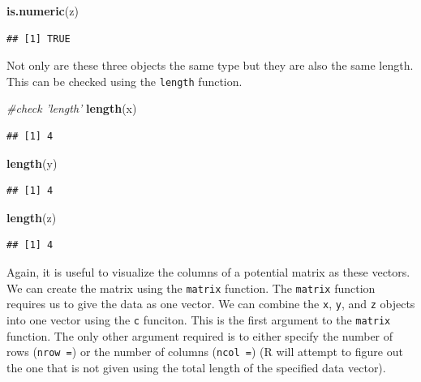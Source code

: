 \documentclass[
]{book}
\newenvironment{Shaded}{\begin{snugshade}}{\end{snugshade}}
\newcommand{\CommentTok}[1]{\textcolor[rgb]{0.56,0.35,0.01}{\textit{#1}}}
\newcommand{\KeywordTok}[1]{\textcolor[rgb]{0.13,0.29,0.53}{\textbf{#1}}}
\newcommand{\NormalTok}[1]{#1}
\theoremstyle{definition}
\theoremstyle{definition}
\theoremstyle{definition}
\theoremstyle{remark}
\begin{document}
\begin{Shaded}
\begin{Highlighting}[]
\KeywordTok{is.numeric}\NormalTok{(z)}
\end{Highlighting}
\end{Shaded}

\begin{verbatim}
## [1] TRUE
\end{verbatim}

Not only are these three objects the same type but they are also the same length. This can be checked using the \texttt{length} function.

\begin{Shaded}
\begin{Highlighting}[]
\CommentTok{#check 'length'}
\KeywordTok{length}\NormalTok{(x)}
\end{Highlighting}
\end{Shaded}

\begin{verbatim}
## [1] 4
\end{verbatim}

\begin{Shaded}
\begin{Highlighting}[]
\KeywordTok{length}\NormalTok{(y)}
\end{Highlighting}
\end{Shaded}

\begin{verbatim}
## [1] 4
\end{verbatim}

\begin{Shaded}
\begin{Highlighting}[]
\KeywordTok{length}\NormalTok{(z)}
\end{Highlighting}
\end{Shaded}

\begin{verbatim}
## [1] 4
\end{verbatim}

Again, it is useful to visualize the columns of a potential matrix as these vectors. We can create the matrix using the \texttt{matrix} function. The \texttt{matrix} function requires us to give the data as one vector. We can combine the \texttt{x}, \texttt{y}, and \texttt{z} objects into one vector using the \texttt{c} funciton. This is the first argument to the \texttt{matrix} function. The only other argument required is to either specify the number of rows (\texttt{nrow\ =}) or the number of columns (\texttt{ncol\ =}) (R will attempt to figure out the one that is not given using the total length of the specified data vector).
\end{document}
